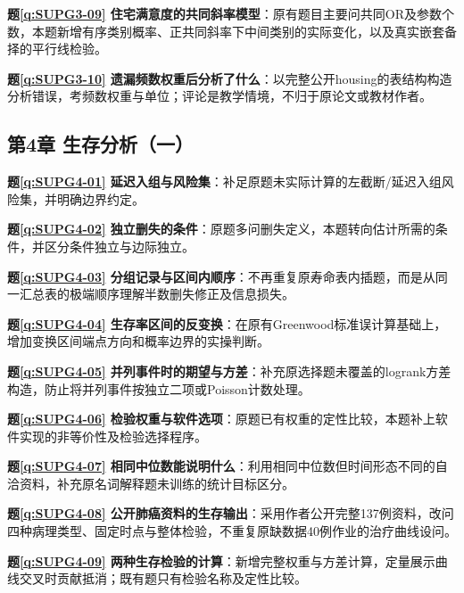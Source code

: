 \noindent\textbf{题\ref*{q:SUPG3-09} 住宅满意度的共同斜率模型}：原有题目主要问共同OR及参数个数，本题新增有序类别概率、正共同斜率下中间类别的实际变化，以及真实嵌套备择的平行线检验。\par

\noindent\textbf{题\ref*{q:SUPG3-10} 遗漏频数权重后分析了什么}：以完整公开housing的表结构构造分析错误，考频数权重与单位；评论是教学情境，不归于原论文或教材作者。\par

\subsection*{第4章 生存分析（一）}

\noindent\textbf{题\ref*{q:SUPG4-01} 延迟入组与风险集}：补足原题未实际计算的左截断/延迟入组风险集，并明确边界约定。\par

\noindent\textbf{题\ref*{q:SUPG4-02} 独立删失的条件}：原题多问删失定义，本题转向估计所需的条件，并区分条件独立与边际独立。\par

\noindent\textbf{题\ref*{q:SUPG4-03} 分组记录与区间内顺序}：不再重复原寿命表内插题，而是从同一汇总表的极端顺序理解半数删失修正及信息损失。\par

\noindent\textbf{题\ref*{q:SUPG4-04} 生存率区间的反变换}：在原有Greenwood标准误计算基础上，增加变换区间端点方向和概率边界的实操判断。\par

\noindent\textbf{题\ref*{q:SUPG4-05} 并列事件时的期望与方差}：补充原选择题未覆盖的logrank方差构造，防止将并列事件按独立二项或Poisson计数处理。\par

\noindent\textbf{题\ref*{q:SUPG4-06} 检验权重与软件选项}：原题已有权重的定性比较，本题补上软件实现的非等价性及检验选择程序。\par

\noindent\textbf{题\ref*{q:SUPG4-07} 相同中位数能说明什么}：利用相同中位数但时间形态不同的自洽资料，补充原名词解释题未训练的统计目标区分。\par

\noindent\textbf{题\ref*{q:SUPG4-08} 公开肺癌资料的生存输出}：采用作者公开完整137例资料，改问四种病理类型、固定时点与整体检验，不重复原缺数据40例作业的治疗曲线设问。\par

\noindent\textbf{题\ref*{q:SUPG4-09} 两种生存检验的计算}：新增完整权重与方差计算，定量展示曲线交叉时贡献抵消；既有题只有检验名称及定性比较。\par

